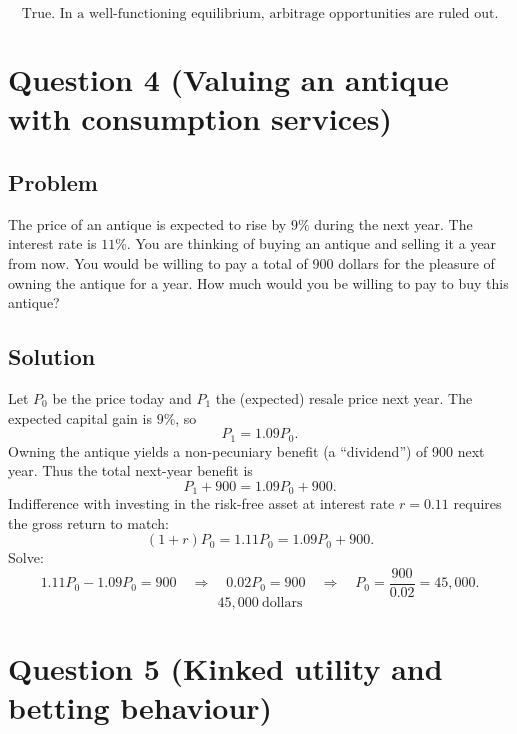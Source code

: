 \documentclass[12pt]{article}
\begin{document}
\[
\boxed{\text{True. In a well-functioning equilibrium, arbitrage opportunities are ruled out.}}
\]

\newpage
\section*{Question 4 (Valuing an antique with consumption services)}
\subsection*{Problem}
The price of an antique is expected to rise by \(9\%\) during the next year. The interest rate is \(11\%\).
You are thinking of buying an antique and selling it a year from now.
You would be willing to pay a total of 900 dollars for the pleasure of owning the antique for a year.
How much would you be willing to pay to buy this antique?

\subsection*{Solution}
Let \(P_0\) be the price today and \(P_1\) the (expected) resale price next year. The expected capital gain is \(9\%\), so
\[
P_1 = 1.09P_0.
\]
Owning the antique yields a non-pecuniary benefit (a ``dividend'') of 900 next year. Thus the total next-year benefit is
\[
P_1 + 900 = 1.09P_0 + 900.
\]
Indifference with investing in the risk-free asset at interest rate \(r=0.11\) requires the gross return to match:
\[
(1+r)P_0 = 1.11P_0 = 1.09P_0 + 900.
\]
Solve:
\[
1.11P_0 - 1.09P_0 = 900
\quad\Longrightarrow\quad
0.02P_0 = 900
\quad\Longrightarrow\quad
P_0 = \frac{900}{0.02} = 45{,}000.
\]
\[
\boxed{45{,}000\ \text{dollars}}
\]

\newpage
\section*{Question 5 (Kinked utility and betting behaviour)}
\end{document}
